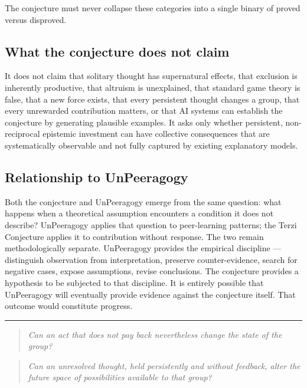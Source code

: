 \documentclass[10pt,twocolumn]{article}
\begin{document}
The conjecture must never collapse these categories into a single binary of proved versus disproved.

\subsection*{What the conjecture does not claim}

It does not claim that solitary thought has supernatural effects, that exclusion is inherently productive, that altruism is unexplained, that standard game theory is false, that a new force exists, that every persistent thought changes a group, that every unrewarded contribution matters, or that AI systems can establish the conjecture by generating plausible examples. It asks only whether persistent, non-reciprocal epistemic investment can have collective consequences that are systematically observable and not fully captured by existing explanatory models.

\subsection*{Relationship to UnPeeragogy}

Both the conjecture and UnPeeragogy emerge from the same question: what happens when a theoretical assumption encounters a condition it does not describe? UnPeeragogy applies that question to peer-learning patterns; the Terzi Conjecture applies it to contribution without response. The two remain methodologically separate. UnPeeragogy provides the empirical discipline --- distinguish observation from interpretation, preserve counter-evidence, search for negative cases, expose assumptions, revise conclusions. The conjecture provides a hypothesis to be subjected to that discipline. It is entirely possible that UnPeeragogy will eventually provide evidence against the conjecture itself. That outcome would constitute progress.

\medskip
\vspace{1em}

{\centering
{\color{ruleblue}\rule{0.6\textwidth}{0.5pt}}\par}

\vspace{0.8em}

\noindent{\small\textcolor{headinggray}{The Terzi Conjecture is not offered as a discovery. It is offered as a question made precise enough to be attacked.\par}}

\vspace{0.3em}
\begin{quote}
\small\emph{Can an act that does not pay back nevertheless change the state of the group?}
\end{quote}
\begin{quote}
\small\emph{Can an unresolved thought, held persistently and without feedback, alter the future space of possibilities available to that group?}
\end{quote}
\end{document}
